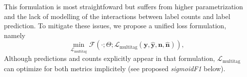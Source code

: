 This formulation is most straightfoward but suffers from higher parametrization and the lack of modelling of the interactions between label counts and label prediction. To mitigate these issues, we propose a unified loss formulation, namely
%
\begin{equation}
\underset{\mathcal{L}_{\text {multitag}}} {\min} \mathcal{F}\left(\cdot ; \Theta; \mathcal{L}_{\text {multitag}} (\mathbf{y}, \hat{\mathbf{y}}, \mathbf{n}, \hat{\mathbf{n}}) \right),
\end{equation}
%
Although predictions and counts explicitly appear in that formulation, \(\mathcal{L}_{\text {multitag}}\) can optimize for both metrics implicitely (see proposed \emph{sigmoidF1} below).



   \cite[p. 308-310]{statLearning}



